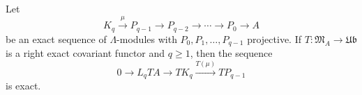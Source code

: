 Let
$$K_q \xrightarrow{\mu} P_{q-1} \rightarrow P_{q-2} \rightarrow \cdots \rightarrow P_0 \rightarrow A$$
be an exact sequence of $\Lambda$-modules with $P_0, P_1, \ldots, P_{q-1}$ projective. If $T : \mathfrak{M}_A \rightarrow \mathfrak{Ub}$ is a right exact covariant functor and $q \geq 1$, then the sequence
$$0 \rightarrow L_q TA \rightarrow TK_q \xrightarrow{T(\mu)} TP_{q-1}$$
is exact.
